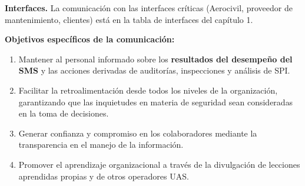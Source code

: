 \textbf{Interfaces.} La comunicación con las interfaces críticas (Aerocivil, proveedor de mantenimiento, clientes) está en la tabla de interfaces del capítulo 1.

\textbf{Objetivos específicos de la comunicación:}

\begin{enumerate}
    \item Mantener al personal informado sobre los \textbf{resultados del desempeño del SMS} y las acciones derivadas de auditorías, inspecciones y análisis de SPI.
    \item Facilitar la retroalimentación desde todos los niveles de la organización, garantizando que las inquietudes en materia de seguridad sean consideradas en la toma de decisiones.
    \item Generar confianza y compromiso en los colaboradores mediante la transparencia en el manejo de la información.
    \item Promover el aprendizaje organizacional a través de la divulgación de lecciones aprendidas propias y de otros operadores UAS.
\end{enumerate}

